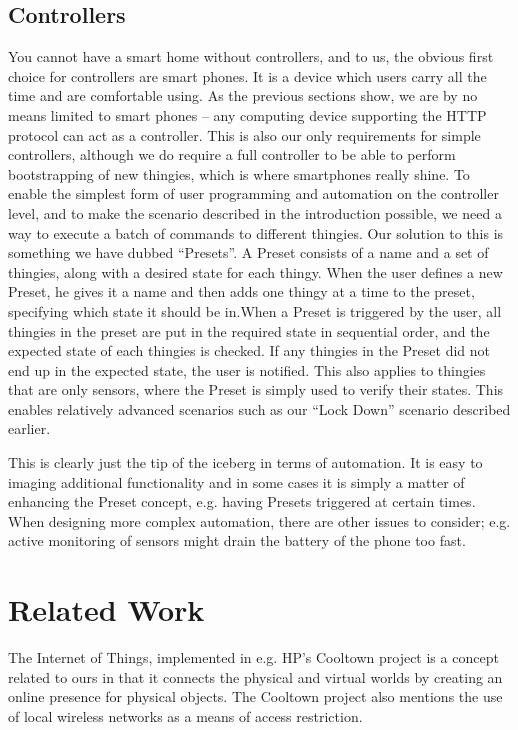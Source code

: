 \documentclass{ubicomp2012}
\begin{document}
\subsection{Controllers}

You cannot have a smart home without controllers, and to us, the obvious first choice for controllers are smart phones. It is a device which users carry all the time and are comfortable using. As the previous sections show, we are by no means limited to smart phones -- any computing device supporting the HTTP protocol can act as a controller. This is also our only requirements for simple controllers, although we do require a full controller to be able to perform bootstrapping of new thingies, which is where smartphones really shine.
To enable the simplest form of user programming and automation on the controller level, and to make the scenario described in the introduction possible, we need a way to execute a batch of commands to different thingies. Our solution to this is something we have dubbed ``Presets''. A Preset consists of a name and a set of thingies, along with a desired state for each thingy. When the user defines a new Preset, he gives it a name and then adds one thingy at a time to the preset, specifying which state it should be in.When a Preset is triggered by the user, all thingies in the preset are put in the required state in sequential order, and the expected state of each thingies is checked. If any thingies in the Preset did not end up in the expected state, the user is notified. This also applies to thingies that are only sensors, where the Preset is simply used to verify their states. This enables relatively advanced scenarios such as our ``Lock Down'' scenario described earlier.

This is clearly just the tip of the iceberg in terms of automation. It is easy to imaging additional functionality and in some cases it is simply a matter of enhancing the Preset concept, e.g. having Presets triggered at certain times. When designing more complex automation, there are other issues to consider; e.g. active monitoring of sensors might drain the battery of the phone too fast.

\section{Related Work}

The Internet of Things, implemented in e.g. HP's Cooltown project\cite{cooltown} is a concept related to ours in that it connects the physical and virtual worlds by creating an online presence for physical objects. The Cooltown project also mentions the use of local wireless networks as a means of access restriction.
\end{document}
